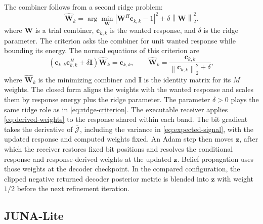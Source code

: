 \documentclass[conference]{IEEEtran}
\newcommand{\norm}[1]{\left\lVert #1\right\rVert}
\begin{document}
The combiner follows from a second ridge problem:
\begin{equation}
  \widehat{\mathbf W}_k
  =
  \arg\min_{\mathbf W}
  \left|\mathbf W^H\mathbf c_{k,k}-1\right|^2
  +\delta\norm{\mathbf W}_2^2 .
  \label{eq:response-combiner-criterion}
\end{equation}
where \(\mathbf W\) is a trial combiner, \(\mathbf c_{k,k}\) is the wanted
response, and \(\delta\) is the ridge parameter.  The criterion asks the
combiner for unit wanted response while bounding its energy.
The normal equations of this criterion are
\begin{equation}
  \left(
  \mathbf c_{k,k}\mathbf c_{k,k}^H+\delta\mathbf I
  \right)\widehat{\mathbf W}_k
  =
  \mathbf c_{k,k},
  \qquad
  \widehat{\mathbf W}_k
  =
  \frac{\mathbf c_{k,k}}
  {\norm{\mathbf c_{k,k}}_2^2+\delta},
  \label{eq:derived-weights}
\end{equation}
where \(\widehat{\mathbf W}_k\) is the minimizing combiner and \(\mathbf I\)
is the identity matrix for its \(M\) weights.  The closed form aligns the
weights with the wanted response and scales them by response energy plus the
ridge parameter.
The parameter \(\delta>0\) plays the same ridge role as in
\eqref{eq:ridge-criterion}.  The executable receiver applies
\eqref{eq:derived-weights} to the response shared within each band.  The bit
gradient takes the derivative of \(\overline{\mathcal J}\), including the
variance in \eqref{eq:expected-signal}, with the updated response and computed
weights fixed.  An Adam step then moves \(\mathbf z\), after which the receiver
restores fixed bit positions and resolves the conditional response and
response-derived weights at the updated \(\mathbf z\).  Belief propagation
uses those weights at the decoder checkpoint.  In the compared configuration,
the clipped negative returned decoder posterior metric is blended into
\(\mathbf z\) with weight \(1/2\) before the next refinement iteration.

\subsection{JUNA-Lite}
\end{document}
